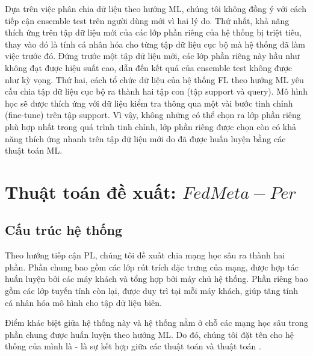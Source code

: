 Dựa trên việc phân chia dữ liệu theo hướng ML, chúng tôi không đồng ý với cách tiếp cận ensemble test trên người dùng mới vì hai lý do. Thứ nhất, khả năng thích ứng trên tập dữ liệu mới của các lớp phần riêng của hệ thống bị triệt tiêu, thay vào đó là tính cá nhân hóa cho từng tập dữ liệu cục bộ mà hệ thống đã làm việc trước đó. Đứng trước một tập dữ liệu mới, các lớp phần riêng này hầu như không đạt được hiệu suất cao, dẫn đến kết quả của ensemble test không được như kỳ vọng. Thứ hai, cách tổ chức dữ liệu của hệ thống FL theo hướng ML yêu cầu chia tập dữ liệu cục bộ ra thành hai tập con (tập support và query). Mô hình học sẽ được thích ứng với dữ liệu kiểm tra thông qua một vài bước tinh chỉnh (fine-tune) trên tập support. Vì vậy, không những có thể chọn ra lớp phần riêng phù hợp nhất trong quá trình tinh chỉnh, lớp phần riêng được chọn còn có khả năng thích ứng nhanh trên tập dữ liệu mới do đã được huấn luyện bằng các thuật toán ML.


\section{Thuật toán đề xuất: $FedMeta-Per$}

\subsection{Cấu trúc hệ thống}

Theo hướng tiếp cận PL, chúng tôi đề xuất chia mạng học sâu ra thành hai phần. Phần chung bao gồm các lớp rút trích đặc trưng của mạng, được hợp tác huấn luyện bởi các máy khách và tổng hợp bởi máy chủ hệ thống. Phần riêng bao gồm các lớp tuyến tính còn lại, được duy trì tại mỗi máy khách, giúp tăng tính cá nhân hóa mô hình cho tập dữ liệu biên.

Điểm khác biệt giữa hệ thống này và hệ thống  nằm ở chỗ các mạng học sâu trong phần chung được huấn luyện theo hướng ML. Do đó, chúng tôi đặt tên cho hệ thống của mình là  - là sự kết hợp giữa các thuật toán  và thuật toán .

